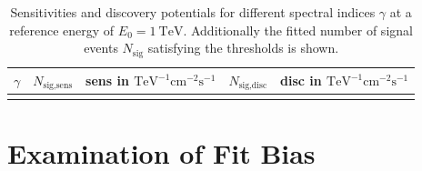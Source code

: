 \begin{table}
  \centering
  \caption{Sensitivities and discovery potentials for different spectral indices $\gamma$ at a reference energy of $E_0 = \SI{1}{\tera\electronvolt}$. Additionally the fitted number of signal events $N_\text{sig}$ satisfying the thresholds is shown.}
  \begin{tabular}{crcrc}
    \toprule
    $\gamma$ & $N_\text{sig,sens}$ &  sens in $\si{\tera\electronvolt\tothe{-1}\centi\meter\tothe{-2}\second\tothe{-1}}$ & $N_\text{sig,disc}$ & disc in $\si{\tera\electronvolt\tothe{-1}\centi\meter\tothe{-2}\second\tothe{-1}}$ \\
    \toprule
      
    \toprule
    \label{tab:sens_disc_time_int}
  \end{tabular}
\end{table}

\section{Examination of Fit Bias}

